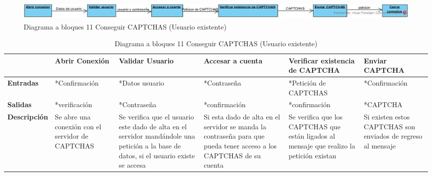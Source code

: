 \begin{figure}[H]
	\includegraphics[width=1\linewidth, height=1cm]{./images/bloques11.jpg}
	\caption{Diagrama a bloques 11 Conseguir CAPTCHAS (Usuario existente)}
	\label{fig:5-11-1}
\end{figure}
\begin{table}[H]
 \centering
   {
     \begin{tabular}{| p{} | p{3cm} | p{2cm} | p{2cm} | p{3cm} | p{3cm} |}
     \hline
     & \textbf{Abrir Conexión} & \textbf{Validar Usuario} & \textbf{Accesar a cuenta} & \textbf{Verificar existencia de CAPTCHA} & \textbf{Enviar CAPTCHA}\\
     \hline
     \textbf{Entradas} & *Confirmación & *Datos usuario & *Contraseña & *Petición de CAPTCHAS & *Confirmación\\
     \hline
     \textbf{Salidas} & *verificación & *Contraseña & *confirmación & *confirmación & *CAPTCHA\\
     \hline
     \textbf{Descripción} & Se abre una conexión con el servidor de CAPTCHAS & Se verifica que el usuario este dado de alta en el servidor mandándole una petición a la base de datos, si el usuario existe se accesa & Si esta dado de alta en el servidor se manda la contraseña para que pueda tener acceso a los CAPTCHAS de su cuenta & Se verifica que los CAPTCHAS que están ligados al mensaje que realizo la petición existan & Si existen estos CAPTCHAS son enviados de regreso al mensaje\\

    \end{tabular}
    }
    \caption{Diagrama a bloques 11 Conseguir CAPTCHAS (Usuario existente)}
    \label{tabla:b11}
\end{table}

